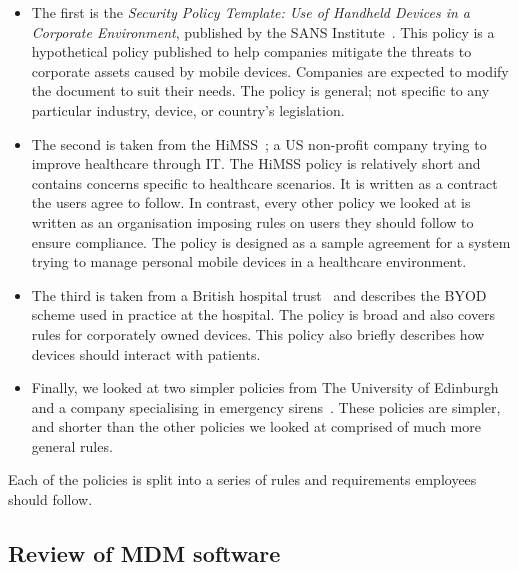 \documentclass[thesis.tex]{subfiles}
\begin{document}
\begin{itemize}
\item The first is the \emph{Security Policy Template: Use of Handheld Devices
    in a Corporate Environment}, published by the SANS
  Institute~\cite{nicholas_r._c._guerin_security_2008}. This policy is a
  hypothetical policy published to help companies mitigate the threats to
  corporate assets caused by mobile devices. Companies are expected to modify the
  document to suit their needs. The policy is general; not specific to any
  particular industry, device, or country's legislation.
\item The second is taken from the
  \ac{HiMSS}~\cite{healthcare_information_and_management_systems_society_mobile_2012};
  a US non-profit company trying to improve healthcare through IT. The \ac{HiMSS}
  policy is relatively short and contains concerns specific to healthcare
  scenarios. It is written as a contract the users agree to follow. In contrast,
  every other policy we looked at is written as an organisation imposing rules on
  users they should follow to ensure compliance. The policy is designed as a
  sample agreement for a system trying to manage personal mobile devices in a
  healthcare environment.
\item The third is taken from a British hospital
  trust~\cite{kennington_mobiles_2014} and describes the BYOD scheme used in
  practice at the hospital.  The policy is broad and also covers rules for
  corporately owned devices.  This policy also briefly describes how devices
  should interact with patients.
\item Finally, we looked at two simpler policies from The University of
  Edinburgh~\cite{williamson_bring_2015} and a company specialising in emergency
  sirens~\cite{code3pse.org_sample_????}. These policies are simpler, and shorter
  than the other policies we looked at comprised of much more general rules.
\end{itemize}

Each of the policies is split into a series of rules and requirements employees
should follow.

\subsection{Review of MDM software}
\end{document}
